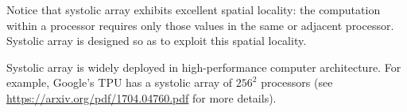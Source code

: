 \documentclass[11pt,a4paper,oneside,microtype,nokorean]{oblivoir}
\begin{document}
Notice that systolic array exhibits excellent spatial locality: the computation within a processor
requires only those values in the same or adjacent processor.  Systolic array is designed so as to
exploit this spatial locality.

Systolic array is widely deployed in high-performance computer architecture.  For example, Google's
TPU has a systolic array of ${256}^2$ processors (see \url{https://arxiv.org/pdf/1704.04760.pdf} for
more details).
\end{document}
